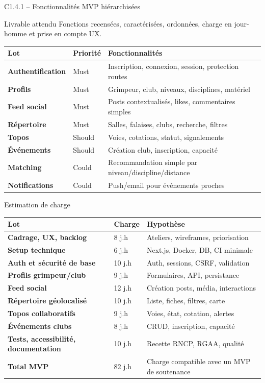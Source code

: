 \documentclass[aspectratio=169,11pt]{beamer}
\newcommand{\competence}[2]{%
  \begin{block}{#1}
    #2
  \end{block}
}
\begin{document}
\begin{frame}{C1.4.1 -- Fonctionnalités MVP hiérarchisées}
  \competence{Livrable attendu}{Fonctions recensées, caractérisées, ordonnées, charge en jour-homme et prise en compte UX.}
  \small
  \begin{tabularx}{\textwidth}{>{\bfseries}p{2.6cm} p{2cm} X}
    Lot & Priorité & Fonctionnalités \\
    \hline
    Authentification & Must & Inscription, connexion, session, protection routes \\
    Profils & Must & Grimpeur, club, niveaux, disciplines, matériel \\
    Feed social & Must & Posts contextualisés, likes, commentaires simples \\
    Répertoire & Must & Salles, falaises, clubs, recherche, filtres \\
    Topos & Should & Voies, cotations, statut, signalements \\
    Événements & Should & Création club, inscription, capacité \\
    Matching & Could & Recommandation simple par niveau/discipline/distance \\
    Notifications & Could & Push/email pour événements proches \\
  \end{tabularx}
\end{frame}

\begin{frame}{Estimation de charge}
  \small
  \begin{tabularx}{\textwidth}{>{\bfseries}p{3.2cm} p{2cm} X}
    Lot & Charge & Hypothèse \\
    \hline
    Cadrage, UX, backlog & 8 j.h & Ateliers, wireframes, priorisation \\
    Setup technique & 6 j.h & Next.js, Docker, DB, CI minimale \\
    Auth et sécurité de base & 10 j.h & Auth, sessions, CSRF, validation \\
    Profils grimpeur/club & 9 j.h & Formulaires, API, persistance \\
    Feed social & 12 j.h & Création posts, média, interactions \\
    Répertoire géolocalisé & 10 j.h & Liste, fiches, filtres, carte \\
    Topos collaboratifs & 9 j.h & Voies, état, cotation, alertes \\
    Événements clubs & 8 j.h & CRUD, inscription, capacité \\
    Tests, accessibilité, documentation & 10 j.h & Recette RNCP, RGAA, qualité \\
    \hline
    Total MVP & 82 j.h & Charge compatible avec un MVP de soutenance \\
  \end{tabularx}
\end{frame}
\end{document}
